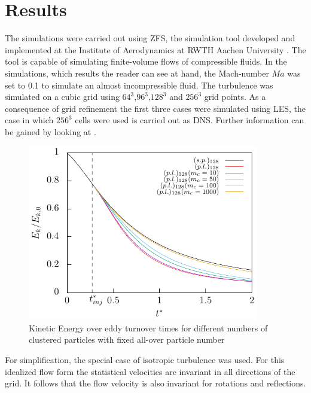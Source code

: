 \documentclass[11pt,a4paper,openany,oneside,parskip=half*]{article}
\begin{document}
\section{Results}
The simulations were carried out using ZFS, the simulation tool developed and implemented at the Institute of Aerodynamics at RWTH Aachen University 
\cite{anAdaptiveMultilevelMultigridFormulationForCartesianHierarchicalGridMethods} \cite{aStrictlyConservativeCartesianCutCellMethodForCompressibleViscousFlowsOnAdaptiveGrids}. 
The tool is capable of simulating finite-volume flows of compressible fluids. In the simulations, which results the reader can see at hand, the Mach-number $Ma$ was set to 0.1 to simulate an almost incompressible fluid.
The turbulence was simulated on a cubic grid using $64^3$,$96^3$,$128^3$ and $256^3$ grid points. As a consequence of grid refinement the first three cases were simulated using LES, 
the case in which $256^3$ cells were used is carried out as DNS. Further information can be gained by looking at \cite[p.344-357 for DNS and p. 558-639 for LES]{turbulentFlows}.
\begin{figure}[h]
	\centering
  \includegraphics[width=0.9\textwidth]{./Abbildungen/128/kineticEnergy_time.pdf}
	\caption{Kinetic Energy over eddy turnover times for different numbers of clustered particles with fixed all-over particle number}
	\label{kineticEnergy_time_128}
\end{figure}
\newline
For simplification, the special case of isotropic turbulence was used. For this idealized flow form the statistical 
velocities are invariant in all directions of the grid. It follows that the flow velocity is also invariant for rotations and reflections. 
\end{document}
